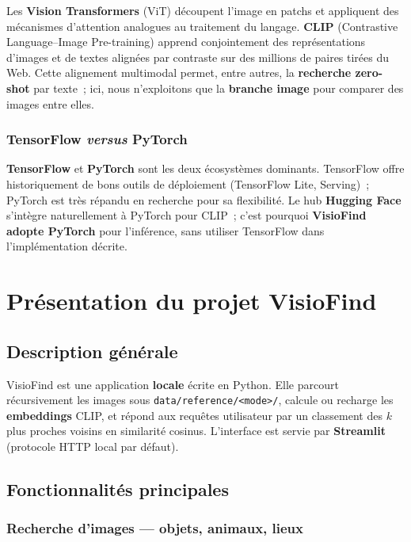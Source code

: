 \documentclass[11pt,a4paper,openany]{report}
\begin{document}
Les \textbf{Vision Transformers} (ViT) découpent l'image en patchs et appliquent des mécanismes d'attention analogues au traitement du langage. \textbf{CLIP} (Contrastive Language–Image Pre-training) apprend conjointement des représentations d'images et de textes alignées par contraste sur des millions de paires tirées du Web. Cette alignement multimodal permet, entre autres, la \textbf{recherche zero-shot} par texte~; ici, nous n'exploitons que la \textbf{branche image} pour comparer des images entre elles.

\subsection{TensorFlow \emph{versus} PyTorch}

\textbf{TensorFlow} et \textbf{PyTorch} sont les deux écosystèmes dominants. TensorFlow offre historiquement de bons outils de déploiement (TensorFlow Lite, Serving)~; PyTorch est très répandu en recherche pour sa flexibilité. Le hub \textbf{Hugging Face} s'intègre naturellement à PyTorch pour CLIP~; c'est pourquoi \textbf{VisioFind adopte PyTorch} pour l'inférence, sans utiliser TensorFlow dans l'implémentation décrite.

\chapter{Présentation du projet VisioFind}

\section{Description générale}

VisioFind est une application \textbf{locale} écrite en Python. Elle parcourt récursivement les images sous \texttt{data/reference/<mode>/}, calcule ou recharge les \textbf{embeddings} CLIP, et répond aux requêtes utilisateur par un classement des $k$ plus proches voisins en similarité cosinus. L'interface est servie par \textbf{Streamlit} (protocole HTTP local par défaut).

\section{Fonctionnalités principales}

\subsection{Recherche d'images — objets, animaux, lieux}
\end{document}
